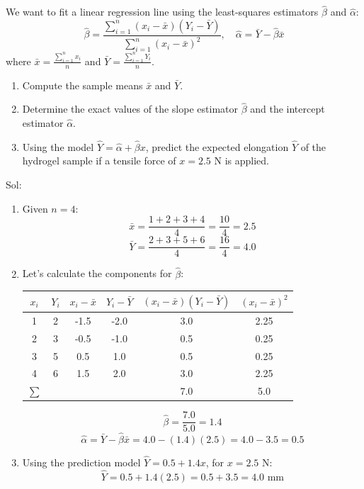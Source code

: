 \documentclass[11pt,svgnames,spanish,oneside]{amsart}
\newenvironment{mysolution}{%
  \bigskip

  \solution\color{blue}Sol:
}{%
  \endsolution
}
\begin{document}
\begin{enumerate}[label=\textbf{P\arabic*.},itemsep=1em,leftmargin=*]
\begin{enumerate}
  \medskip
  We want to fit a linear regression line using the least-squares estimators $\hat{\beta}$ and $\hat{\alpha}$:
  $$ \hat{\beta} = \frac{\sum_{i=1}^n (x_i - \bar{x})(Y_i - \bar{Y})}{\sum_{i=1}^n (x_i - \bar{x})^2}, \quad \hat{\alpha} = \bar{Y} - \hat{\beta}\bar{x} $$
  where $\bar{x} = \frac{\sum_{i=1}^n x_i}{n}$ and $\bar{Y} = \frac{\sum_{i=1}^n Y_i}{n}$.

  \begin{enumerate}
    \item Compute the sample means $\bar{x}$ and $\bar{Y}$.
    \item Determine the exact values of the slope estimator $\hat{\beta}$ and the intercept estimator $\hat{\alpha}$.
    \item Using the model $\hat{Y} = \hat{\alpha} + \hat{\beta}x$, predict the expected elongation $\hat{Y}$ of the hydrogel sample if a tensile force of $x = 2.5$ N is applied.
  \end{enumerate}

    \begin{mysolution}
  \begin{enumerate}[label=(\alph*)]
    \item Given $n = 4$:
    $$ \bar{x} = \frac{1 + 2 + 3 + 4}{4} = \frac{10}{4} = \mathbf{2.5} $$
    $$ \bar{Y} = \frac{2 + 3 + 5 + 6}{4} = \frac{16}{4} = \mathbf{4.0} $$

    \item Let's calculate the components for $\hat{\beta}$:
    \begin{center}
    \begin{tabular}{|c|c|c|c|c|c|}
      \hline
      $x_i$ & $Y_i$ & $x_i - \bar{x}$ & $Y_i - \bar{Y}$ & $(x_i - \bar{x})(Y_i - \bar{Y})$ & $(x_i - \bar{x})^2$ \\ \hline
      1 & 2 & -1.5 & -2.0 & 3.0 & 2.25 \\
      2 & 3 & -0.5 & -1.0 & 0.5 & 0.25 \\
      3 & 5 & 0.5 & 1.0 & 0.5 & 0.25 \\
      4 & 6 & 1.5 & 2.0 & 3.0 & 2.25 \\ \hline
      $\sum$ & & & & 7.0 & 5.0 \\ \hline
    \end{tabular}
    \end{center}
    $$ \hat{\beta} = \frac{7.0}{5.0} = 1.4 $$
    $$ \hat{\alpha} = \bar{Y} - \hat{\beta}\bar{x} = 4.0 - (1.4)(2.5) = 4.0 - 3.5 = 0.5 $$

    \item Using the prediction model $\hat{Y} = 0.5 + 1.4x$, for $x = 2.5$ N:
    $$ \hat{Y} = 0.5 + 1.4(2.5) = 0.5 + 3.5 = 4.0 \text{ mm} $$
  \end{enumerate}
  \end{mysolution}



\end{enumerate}
\end{enumerate}
\end{document}

